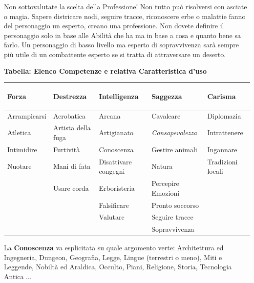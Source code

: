 \begin{multicols}{2}
\begin{changemargin}{0.3cm}{0.3cm}\begin{tcolorbox}[title = Professione ???]
Non sottovalutate la scelta della Professione! Non tutto può risolversi con asciate o magia. Sapere districare nodi, seguire tracce, riconoscere erbe o malattie fanno del personaggio un esperto, creano una professione. Non dovete definire il personaggio solo in base alle Abilità che ha ma in base a cosa e quanto bene sa farlo. Un personaggio di basso livello ma esperto di sopravvivenza sarà sempre più utile di un combattente esperto se si tratta di attraversare un deserto.\end{tcolorbox}\end{changemargin}

\end{multicols}

\medskip

\textbf{Tabella: Elenco Competenze e relativa Caratteristica d'uso}

\medskip

\begin{tabular}{lllll}\label{competenzeelenco}\hypertarget{competenzeelenco}{}
\textbf{Forza} & \textbf{Destrezza} & \textbf{Intelligenza} & \textbf{Saggezza} & \textbf{Carisma}\\
\toprule
Arrampicarsi	& Acrobatica		& Arcana		&Cavalcare				& Diplomazia \\
Atletica		& Artista della fuga& Artigianato 	&\emph{Consapevolezza} 	& Intrattenere \\
Intimidire		& Furtività 		& Conoscenza	&Gestire animali		& Ingannare \\
Nuotare 		& Mani di fata		& Disattivare congegni &Natura			& Tradizioni locali \\
				& Usare corda		& Erboristeria		& Percepire Emozioni	&\\
& 				& Falsificare		& Pronto soccorso	& \\
& 				& Valutare			& Seguire tracce	&\\
&				& 					& Sopravvivenza		&\\
\end{tabular}

\medskip

La \textbf{Conoscenza} va esplicitata su quale argomento verte: Architettura ed Ingegneria, Dungeon, Geografia, Legge, Lingue (terrestri o meno), Miti e Leggende, Nobiltà ed Araldica, Occulto, Piani, Religione, Storia, Tecnologia Antica ...

